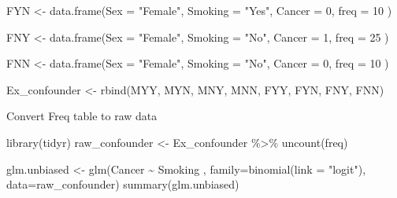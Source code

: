 \documentclass[
]{book}
\newenvironment{Shaded}{\begin{snugshade}}{\end{snugshade}}
\newcommand{\AttributeTok}[1]{\textcolor[rgb]{0.77,0.63,0.00}{#1}}
\newcommand{\DecValTok}[1]{\textcolor[rgb]{0.00,0.00,0.81}{#1}}
\newcommand{\FunctionTok}[1]{\textcolor[rgb]{0.00,0.00,0.00}{#1}}
\newcommand{\NormalTok}[1]{#1}
\newcommand{\OtherTok}[1]{\textcolor[rgb]{0.56,0.35,0.01}{#1}}
\newcommand{\SpecialCharTok}[1]{\textcolor[rgb]{0.00,0.00,0.00}{#1}}
\newcommand{\StringTok}[1]{\textcolor[rgb]{0.31,0.60,0.02}{#1}}
\begin{document}
\begin{Shaded}
\begin{Highlighting}[]
\NormalTok{FYN }\OtherTok{\textless{}{-}} \FunctionTok{data.frame}\NormalTok{(}\AttributeTok{Sex =} \StringTok{"Female"}\NormalTok{,}
                  \AttributeTok{Smoking =} \StringTok{"Yes"}\NormalTok{,}
                  \AttributeTok{Cancer =} \DecValTok{0}\NormalTok{,}
                  \AttributeTok{freq =} \DecValTok{10}
\NormalTok{                  )}

\NormalTok{FNY }\OtherTok{\textless{}{-}} \FunctionTok{data.frame}\NormalTok{(}\AttributeTok{Sex =} \StringTok{"Female"}\NormalTok{,}
                  \AttributeTok{Smoking =} \StringTok{"No"}\NormalTok{,}
                  \AttributeTok{Cancer =} \DecValTok{1}\NormalTok{,}
                  \AttributeTok{freq =} \DecValTok{25}
\NormalTok{                  )}

\NormalTok{FNN }\OtherTok{\textless{}{-}} \FunctionTok{data.frame}\NormalTok{(}\AttributeTok{Sex =} \StringTok{"Female"}\NormalTok{,}
                  \AttributeTok{Smoking =} \StringTok{"No"}\NormalTok{,}
                  \AttributeTok{Cancer =} \DecValTok{0}\NormalTok{,}
                  \AttributeTok{freq =} \DecValTok{10}
\NormalTok{                  )}

\NormalTok{Ex\_confounder }\OtherTok{\textless{}{-}} \FunctionTok{rbind}\NormalTok{(MYY, MYN, MNY, MNN, FYY, FYN, FNY, FNN)}
\end{Highlighting}
\end{Shaded}

Convert Freq table to raw data

\begin{Shaded}
\begin{Highlighting}[]
\FunctionTok{library}\NormalTok{(tidyr)}
\NormalTok{raw\_confounder }\OtherTok{\textless{}{-}}\NormalTok{ Ex\_confounder }\SpecialCharTok{\%\textgreater{}\%} 
  \FunctionTok{uncount}\NormalTok{(freq)}
\end{Highlighting}
\end{Shaded}

\begin{Shaded}
\begin{Highlighting}[]
\NormalTok{glm.unbiased }\OtherTok{\textless{}{-}} \FunctionTok{glm}\NormalTok{(Cancer }\SpecialCharTok{\textasciitilde{}}\NormalTok{ Smoking , }\AttributeTok{family=}\FunctionTok{binomial}\NormalTok{(}\AttributeTok{link =} \StringTok{"logit"}\NormalTok{), }\AttributeTok{data=}\NormalTok{raw\_confounder)}
\FunctionTok{summary}\NormalTok{(glm.unbiased)}
\end{Highlighting}
\end{Shaded}
\end{document}
